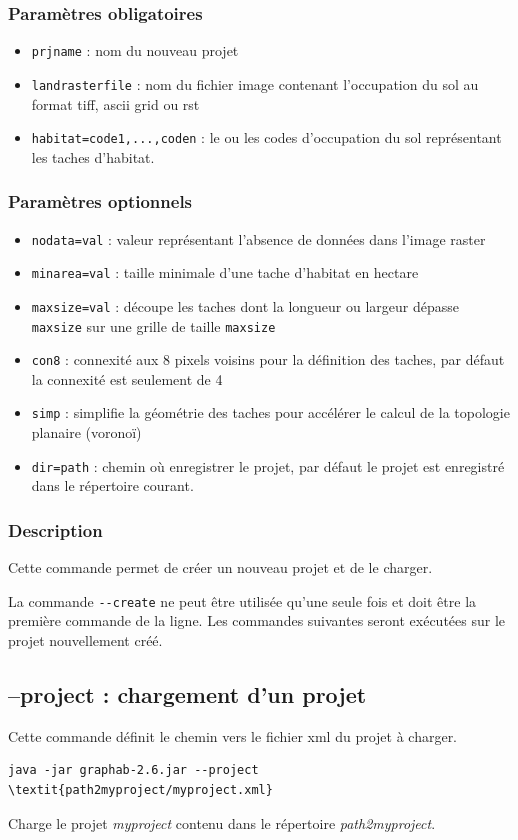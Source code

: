 \documentclass[a4paper,10pt]{report}
\begin{document}
\subsubsection{Paramètres obligatoires}
\begin{itemize}
	\item \verb|prjname| : nom du nouveau projet
	\item \verb|landrasterfile| : nom du fichier image contenant l'occupation du sol au format tiff, ascii grid ou rst
	\item \verb|habitat=code1,...,coden| : le ou les codes d'occupation du sol représentant les taches d'habitat.
\end{itemize}

\subsubsection{Paramètres optionnels}
\begin{itemize}
	\item \verb|nodata=val| : valeur représentant l'absence de données dans l'image raster
	\item \verb|minarea=val| : taille minimale d'une tache d'habitat en hectare
	\item \verb|maxsize=val| : découpe les taches dont la longueur ou largeur dépasse \verb|maxsize| sur une grille de taille \verb|maxsize|
	\item \verb|con8| : connexité aux 8 pixels voisins pour la définition des taches, par défaut la connexité est seulement de 4
	\item \verb|simp| : simplifie la géométrie des taches pour accélérer le calcul de la topologie planaire (voronoï)
	\item \verb|dir=path| : chemin où enregistrer le projet, par défaut le projet est enregistré dans le répertoire courant.
\end{itemize}

\subsubsection{Description}
Cette commande permet de créer un nouveau projet et de le charger.

La commande \verb|--create| ne peut être utilisée qu'une seule fois et doit être la première commande de la ligne.
Les commandes suivantes seront exécutées sur le projet nouvellement créé.

\subsection{--project : chargement d'un projet}
Cette commande définit le chemin vers le fichier xml du projet à charger.
\begin{Verbatim}[commandchars=\\\{\}]
	java -jar graphab-2.6.jar --project \textit{path2myproject/myproject.xml}
\end{Verbatim}
Charge le projet \textit{myproject} contenu dans le répertoire \textit{path2myproject}.
\end{document}
